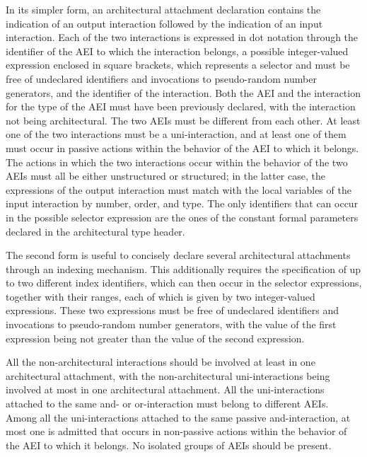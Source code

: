 In its simpler form, an architectural attachment declaration contains the indication of an output
interaction followed by the indication of an input interaction. Each of the two interactions is expressed in
dot notation through the identifier of the AEI to which the interaction belongs, a possible integer-valued
expression enclosed in square brackets, which represents a selector and must be free of undeclared
identifiers and invocations to pseudo-random number generators, and the identifier of the interaction. Both
the AEI and the interaction for the type of the AEI must have been previously declared, with the interaction
not being architectural. The two AEIs must be different from each other. At least one of the two
interactions must be a uni-interaction, and at least one of them must occur in passive actions within the
behavior of the AEI to which it belongs. The actions in which the two interactions occur within the behavior
of the two AEIs must all be either unstructured or structured; in the latter case, the expressions of the
output interaction must match with the local variables of the input interaction by number, order, and type.
The only identifiers that can occur in the possible selector expression are the ones of the constant formal
parameters declared in the architectural type header.

The second form is useful to concisely declare several architectural attachments through an indexing
mechanism. This additionally requires the specification of up to two different index identifiers, which can
then occur in the selector expressions, together with their ranges, each of which is given by two
integer-valued expressions. These two expressions must be free of undeclared identifiers and invocations to
pseudo-random number generators, with the value of the first expression being not greater than the value of
the second expression.

All the non-architectural interactions should be involved at least in one architectural attachment, with the
non-architectural uni-interactions being involved at most in one architectural attachment. All the
uni-interactions attached to the same and- or or-interaction must belong to different AEIs. Among all the
uni-interactions attached to the same passive and-interaction, at most one is admitted that occurs in
non-passive actions within the behavior of the AEI to which it belongs. No isolated groups of AEIs should be
present.



